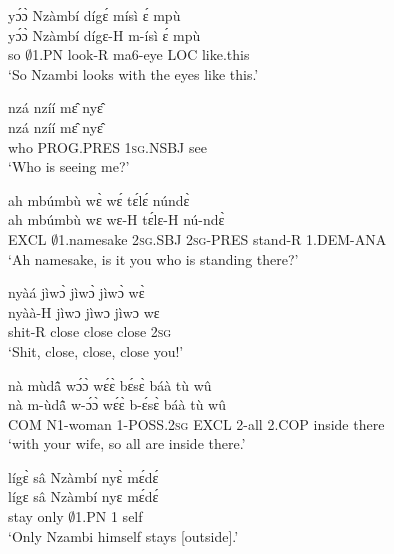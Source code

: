 \begin{exe} 
\exN\label{156}
  \glll yɔ́ɔ̀ Nzàmbí dígɛ́ mísì ɛ́ mpù \\
      yɔ́ɔ̀ Nzàmbí dígɛ-H m-ísì ɛ́ mpù \\
       so $\emptyset$1.PN look-R ma6-eye LOC like.this  \\
    \trans `So Nzambi looks with the eyes like this.'
\end{exe}

\begin{exe} 
\exN\label{157}
  \glll nzá nzíí mɛ̂ nyɛ̂ \\
    nzá nzíí mɛ̂ nyɛ̂ \\
         who PROG.PRES 1\textsc{sg}.NSBJ see\\
    \trans `Who is seeing me?'
\end{exe}

\begin{exe} 
\exN\label{158} 
  \glll ah mbúmbù wɛ̀ wɛ́ tɛ́lɛ́ núndɛ̀ \\
      ah mbúmbù wɛ wɛ-H tɛ́lɛ-H nú-ndɛ̀ \\
        EXCL $\emptyset$1.namesake 2\textsc{sg}.SBJ 2\textsc{sg}-PRES stand-R 1.DEM-ANA \\
    \trans `Ah namesake, is it you who is standing there?'
\end{exe}

\begin{exe} 
\exN\label{159}
  \glll nyàá jìwɔ̀ jìwɔ̀ jìwɔ̀ wɛ̀ \\
      nyàà-H jìwɔ jìwɔ jìwɔ wɛ \\
        shit-R close close close 2\textsc{sg} \\
    \trans `Shit, close, close, close you!'
\end{exe}

\begin{exe} 
\exN\label{160}
  \glll nà mùdã̂ wɔ́ɔ̀ wɛ́ɛ̀ bɛ́sɛ̀ báà tù wû \\
      nà m-ùdã̂ w-ɔ́ɔ̀ wɛ́ɛ̀ b-ɛ́sɛ̀ báà tù wû \\
        COM N1-woman 1-POSS.2\textsc{sg} EXCL 2-all 2.COP inside there \\
    \trans `with your wife, so all are inside there.'
\end{exe}

\begin{exe} 
\exN\label{161}
  \glll lígɛ̀ sâ Nzàmbí nyɛ̀ mɛ́dɛ́ \\
    lígɛ sâ Nzàmbí nyɛ mɛ́dɛ́ \\
       stay only $\emptyset$1.PN 1 self  \\
    \trans `Only Nzambi himself stays [outside].'
\end{exe}

